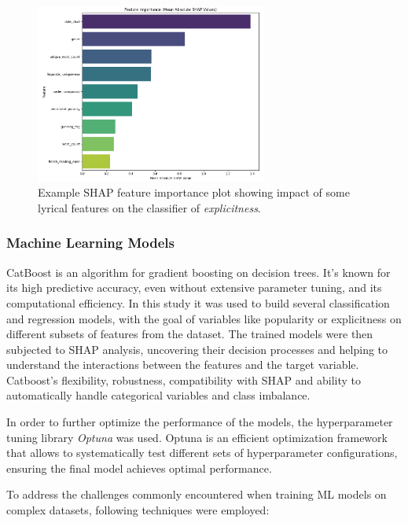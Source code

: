 \begin{center}
\begin{figure}[H]
  \centering
  \includegraphics[width=3in]{img/shap_feature_importance.png}
  \caption{Example SHAP feature importance plot showing impact of some lyrical features
  on the classifier of \textit{explicitness}.}
  \label{Figure:fig_beh}
\end{figure}
\end{center}

\subsubsection*{Machine Learning Models}
CatBoost is an algorithm for gradient boosting on decision trees. It's known
for its high predictive accuracy, even without extensive parameter tuning, and
its computational efficiency. In this study it was used to build several
classification and regression models, with the goal of variables like
popularity or explicitness on different subsets of features from the dataset.
The trained models were then subjected to SHAP analysis, uncovering their
decision processes and helping to understand the interactions between the
features and the target variable. Catboost's flexibility, robustness,
compatibility with SHAP and ability to automatically handle categorical
variables and class imbalance.\cite{catboost}


In order to further optimize the performance of the models, the
hyperparameter tuning library \textit{Optuna} was used. Optuna is an
efficient optimization framework that allows to systematically test different
sets of hyperparameter configurations, ensuring the final model achieves
optimal performance.\cite{optuna} 

To address the challenges commonly encountered when training ML models on
complex datasets, following techniques were employed:

